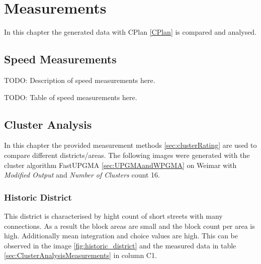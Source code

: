 \chapter{Measurements}
\label{sec:measurements}
In this chapter the generated data with CPlan \ref{CPlan} is compared and analysed. 
\section{Speed Measurements}
\label{sec:measurements-speed}
TODO: Description of speed measurements here. 

TODO: Table of speed measurements here.

\section{Cluster Analysis}
\label{sec:measurements-cluster-analysis}
In this chapter the provided measurement methods \ref{sec:clusterRating} are used to compare different districts/areas. The following images were generated with the cluster algorithm FastUPGMA \ref{sec:UPGMAandWPGMA} on Weimar with \textit{Modified Output} and \textit{Number of Clusters} count 16.

\subsection{Historic District}
\label{sec:historyDistinct}
This district is characterised by hight count of short streets with many connections. As a result the block areas are small and the block count per area is high. Additionally mean integration and choice values are high. This can be observed in the image \ref{fig:historic_district} and the measured data in table \ref{sec:ClusterAnalysisMeasurements} in column C1.


